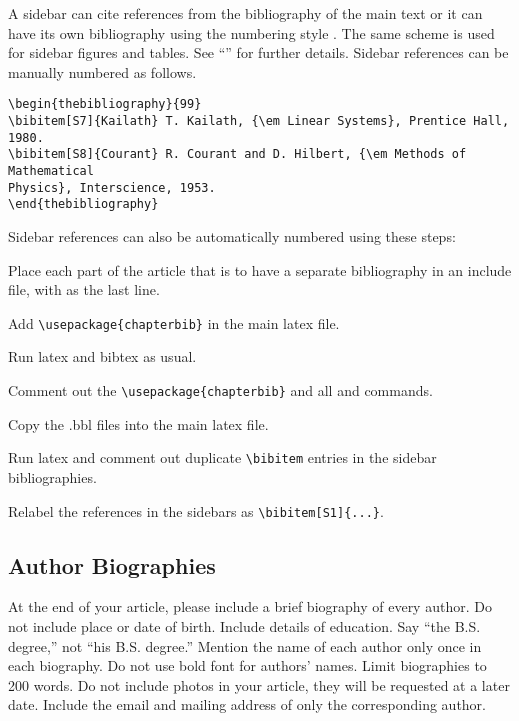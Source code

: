 A sidebar can cite references from the bibliography of the main text or it can have its own bibliography using the numbering style \cite{S1,S2}. The same scheme is used for sidebar figures and tables. 
See ``'' for further details. 
%
Sidebar references can be manually numbered as follows.
\begin{verbatim} 
\begin{thebibliography}{99}
\bibitem[S7]{Kailath} T. Kailath, {\em Linear Systems}, Prentice Hall, 1980.
\bibitem[S8]{Courant} R. Courant and D. Hilbert, {\em Methods of Mathematical 
Physics}, Interscience, 1953.
\end{thebibliography}
\end{verbatim} 
%
Sidebar references can also be automatically numbered using these steps:
\bee
\item Place each part of the article that is to have a separate bibliography in an include file, with \verb!! as the last line. 
\item Add \verb!\usepackage{chapterbib}!  in the main latex file. 
\item Run latex and bibtex as usual. 
\item Comment out the \verb!\usepackage{chapterbib}!  and all \verb!! and  \verb!! commands. 
\item Copy the .bbl files into the main latex file. 
\item  Run latex and comment out duplicate  \verb!\bibitem!  entries in the sidebar bibliographies.
\item  Relabel the references in the sidebars as  \verb!\bibitem[S1]{...}!. 
\eee

\subsection{Author Biographies}
At the end of your article, please include a brief biography of every author.  
Do not include place or date of birth. Include details of education.  Say ``the B.S. degree,'' not ``his B.S. degree.'' Mention the name of each author only once in each biography.  Do not use bold font for authors’ names. Limit biographies to 200 words.
Do not include photos in your article, they will be requested at a later date. 
Include the email and mailing address of only the corresponding author.
